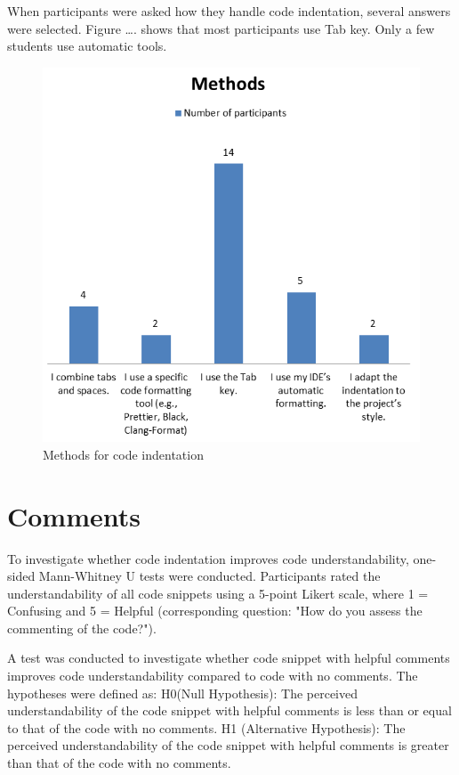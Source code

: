 When participants were asked how they handle code indentation, several answers were selected. Figure …. shows that most participants use Tab key. Only a few students use automatic tools.  

\begin{figure} [H]
  \centering
  \includegraphics[scale=0.9]{figures/inM.png}
  \caption{Methods for code indentation}
  \label{fig:AnhangsChor}
\end{figure}



\section{Comments}


To investigate whether code indentation improves code understandability, one-sided Mann-Whitney U tests were conducted. Participants rated the understandability of all code snippets using a 5-point Likert scale, where 1 = Confusing and 5 = Helpful (corresponding question: "How do you assess the commenting of the code?").

A test was conducted to investigate whether code snippet with helpful comments improves code understandability compared to code with no comments. The hypotheses were defined as:
H0(Null Hypothesis): The perceived understandability of the code snippet with helpful comments is less than or equal to that of the code with no comments. H1 (Alternative Hypothesis): The perceived understandability of the code snippet with helpful comments is greater than that of the code with no comments.

